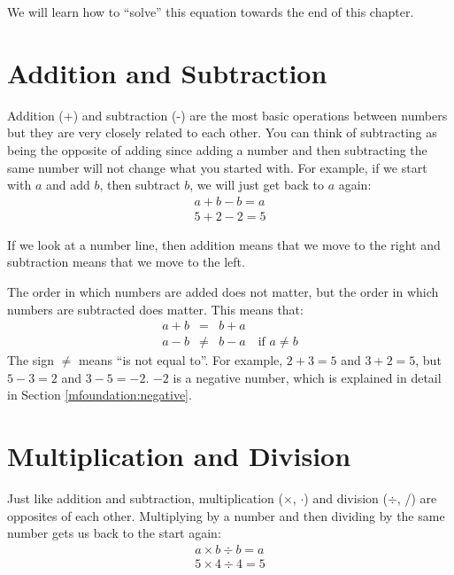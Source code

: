 \documentclass[10pt,a4paper,titlepage,twoside,openright]{report}
\begin{document}
We will learn how to ``solve'' this equation towards the end of this chapter.

\section{Addition and Subtraction}
\label{mfoundation:alg:a}
Addition (+) and subtraction (-) are the most basic operations between numbers but they are very closely related to each other. You can think of subtracting as being the opposite of adding since adding a number and then subtracting the same number will not change what you started with. For example, if we start with $a$ and add $b$, then subtract $b$, we will just get back to
$a$ again:
\begin{eqnarray}
  \label{eq:mfoundation:alg:a:addsub}
  a+b-b=a\\ \nonumber
  5+2-2=5
\end{eqnarray}

If we look at a number line, then addition means that we move to the right and subtraction means that we move to the left.

The order in which numbers are added does not matter, but the order in which numbers are subtracted does matter. This means that:
\begin{eqnarray}
  \label{eq:mfoundation:alg:a:associativityadd}
  a+b&=&b+a\\ \nonumber
  a-b&\neq&b-a \quad \mbox{if $a \neq b$}
\end{eqnarray}
The sign $\neq$ means ``is not equal to''. For example, $2+3=5$ and $3+2=5$, but $5-3=2$ and $3-5=-2$. $-2$ is a negative number, which is explained in detail in Section \ref{mfoundation:negative}.


\section{Multiplication and Division}
\label{mfoundation:alg:m}
Just like addition and subtraction, multiplication ($\times$, $\cdot$) and
division ($\div$, /) are opposites of each other. Multiplying by a number and
then dividing by the same number gets us back to the start again:
\begin{eqnarray}
  \label{eq:mfoundation:alg:m:multdiv}
  a\times b\div b=a\\ \nonumber
  5\times 4\div 4=5
\end{eqnarray}
\end{document}

